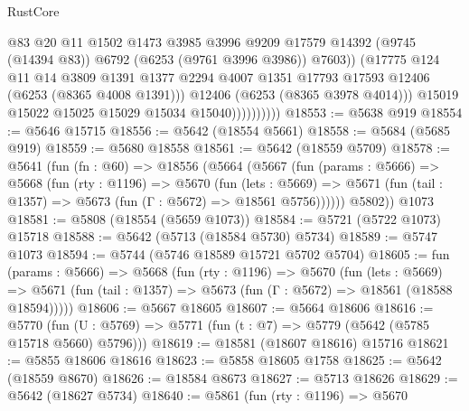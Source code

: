 \begin{lexlean}{RustCore}
\begin{coremodule}
                              @83
                              @20
                              @11
                              @1502
                              @1473
                              @3985
                              @3996
                              @9209
                              @17579
                              @14392
                              (@9745 (@14394 @83))
                              @6792
                              (@6253 (@9761 @3996 @3986))
                              @7603))
                          (@17775
                            @124
                            @11
                            @14
                            @3809
                            @1391
                            @1377
                            @2294
                            @4007
                            @1351
                            @17793
                            @17593
                            @12406
                            (@6253 (@8365 @4008 @1391)))
                          @12406
                          (@6253 (@8365 @3978 @4014)))
                        @15019
                        @15022
                        @15025
                        @15029
                        @15034
                        @15040))))))))))
@18553 := @5638 @919
@18554 := @5646 @15715
@18556 := @5642 (@18554 @5661)
@18558 := @5684 (@5685 @919)
@18559 := @5680 @18558
@18561 := @5642 (@18559 @5709)
@18578 := @5641
    (fun (fn : @60) =>
    @18556
      (@5664
        (@5667
          (fun (params : @5666) =>
          @5668
            (fun (rty : @1196) =>
            @5670
              (fun (lets : @5669) =>
              @5671 (fun (tail : @1357) => @5673 (fun (Γ : @5672) => @18561 @5756))))))
        @5802))
    @1073
@18581 := @5808 (@18554 (@5659 @1073))
@18584 := @5721 (@5722 @1073) @15718
@18588 := @5642 (@5713 (@18584 @5730) @5734)
@18589 := @5747 @1073
@18594 := @5744 (@5746 @18589 @15721 @5702 @5704)
@18605 := fun (params : @5666) =>
  @5668
    (fun (rty : @1196) =>
    @5670
      (fun (lets : @5669) =>
      @5671 (fun (tail : @1357) => @5673 (fun (Γ : @5672) => @18561 (@18588 @18594)))))
@18606 := @5667 @18605
@18607 := @5664 @18606
@18616 := @5770
    (fun (U : @5769) => @5771 (fun (t : @7) => @5779 (@5642 (@5785 @15718 @5660) @5796)))
@18619 := @18581 (@18607 @18616) @15716
@18621 := @5855 @18606 @18616
@18623 := @5858 @18605 @1758
@18625 := @5642 (@18559 @8670)
@18626 := @18584 @8673
@18627 := @5713 @18626
@18629 := @5642 (@18627 @5734)
@18640 := @5861
    (fun (rty : @1196) =>
    @5670

\end{coremodule}
\end{lexlean}

